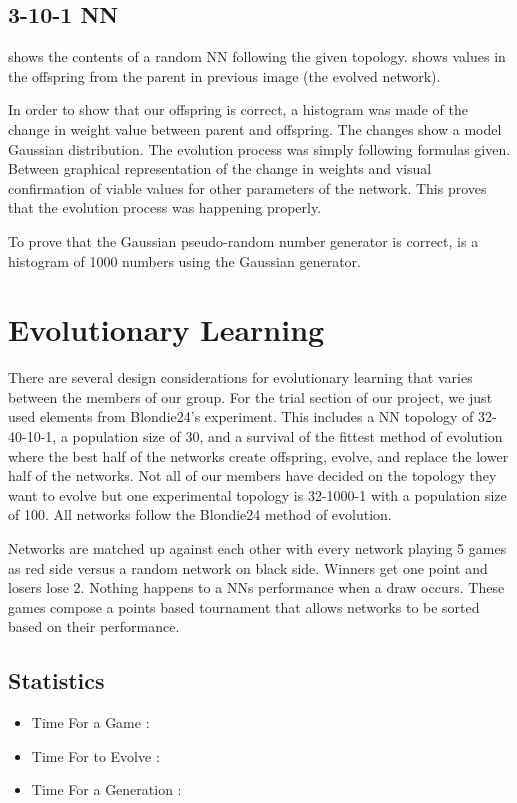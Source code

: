 \documentclass{article}
\begin{document}
\subsection{3-10-1 NN}

 shows the contents of a random
NN following the given topology.  shows values in the offspring from the
parent in previous image (the evolved network).

In order to show that our offspring is correct, a
histogram was made of the change in weight value between parent and offspring. The
changes show a model Gaussian distribution. The evolution process was simply following formulas
given. Between graphical representation of the change in weights and visual
confirmation of viable values for other parameters of the network. This proves that
the evolution process was happening properly.

To prove that the Gaussian pseudo-random number generator is correct, 
is a histogram of 1000 numbers using the Gaussian generator.

\section{Evolutionary Learning}

There are several design considerations for evolutionary
learning that varies between the members of our group. For the trial section of
our project, we just used elements from Blondie24’s experiment. This includes a
NN topology of 32-40-10-1, a population size of 30, and a survival of the
fittest method of evolution where the best half of the networks create
offspring, evolve, and replace the lower half of the networks. Not all of our
members have decided on the topology they want to evolve but one experimental
topology is 32-1000-1 with a population size of 100. All networks follow the
Blondie24 method of evolution.

Networks are matched up against each other with
every network playing 5 games as red side versus a random network on black
side. Winners get one point and losers lose 2. Nothing happens to a NNs
performance when a draw occurs. These games compose a points based tournament
that allows networks to be sorted based on their performance.

\subsection{Statistics}
\begin{itemize}
    \item Time For a Game       :
    \item Time For to Evolve    :
    \item Time For a Generation :
\end{itemize}
\end{document}
